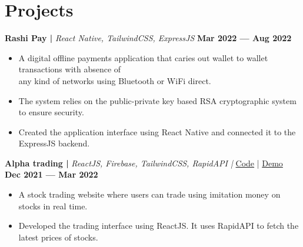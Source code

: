 \documentclass[a4,10pt]{article}
\newenvironment{zitemize}{
\begin{itemize}\itemsep0pt \parskip0pt \parsep1pt}
{\end{itemize}\vspace{-0.5cm}}
\begin{document}
\section{Projects}
\vspace{-0.1cm}
\textbf{Rashi Pay | } \emph{React Native, TailwindCSS, ExpressJS} \textbf{\hfill Mar 2022 --- Aug 2022}
\vspace{-0.2cm}
    \begin{zitemize}
        \item A digital offline payments application that caries out wallet to wallet transactions with absence of\\ any kind of networks using Bluetooth or WiFi direct.
        \item The system relies on the public-private key based RSA cryptographic system to ensure security.
        \item Created the application interface using React Native and connected it to the ExpressJS backend.
    \end{zitemize}
    
    
\vspace{0.35cm}
\textbf{Alpha trading | } \emph{ReactJS, Firebase, TailwindCSS, RapidAPI |  }{\href{https://github.com/Harsh-H-Shah/Alpha-trading}{
            \color{UI_blue} Code}}
            | 
            {\href{https://alpha-trading.netlify.app/}{
            \color{UI_blue} Demo} } \textbf{\hfill Dec 2021 --- Mar 2022} 
\vspace{-0.2cm}
    \begin{zitemize}
        \item A stock trading website where users can trade using imitation money on stocks in real time.
        \item Developed the trading interface using ReactJS. It uses RapidAPI to fetch the latest prices of stocks.
    \end{zitemize}
\end{document}
